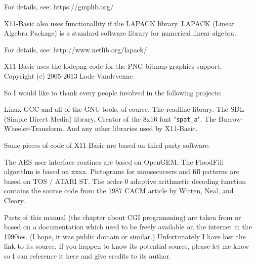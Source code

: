 For details, see: https://gmplib.org/

X11-Basic also uses functionallity if the LAPACK library. 
LAPACK (Linear Algebra Package) is a standard software library for 
numerical linear algebra. 

For details, see: http://www.netlib.org/lapack/

X11-Basic uses the lodepng code for the PNG bitmap graphics support.
Copyright (c) 2005-2013 Lode Vandevenne




So I would like to thank every people involved in the following projects:

    Linux
    GCC and all of the GNU tools, of course.
    The readline library.
    The SDL (Simple Direct Media) library.
    Creator of the 8x16 font "\verb|spat_a|".
    The Burrow-Wheeler-Transform.
    And any other libraries used by X11-Basic.
 
Some pieces of code of X11-Basic are based on third party software:

    The AES user interface routines are based on OpenGEM.
    The FloodFill algorithm is based on xxxx.
    Pictograms for mousecursers and fill patterns are based on TOS / ATARI ST.
    The order-0 adaptive arithmetic decoding function  contains the source code 
    from the 1987 CACM article by Witten, Neal, and Cleary.
    

Parts of this manual (the chapter about CGI programming) are taken from or 
based on a documentation which used to be freely available on the internet  in
the 1990ies. (I hope, it was public domain or similar.) Unfortunately I have
lost the link to its source. If you happen to know its potential source, please
let me know so I can reference it here and give credits to its author.
